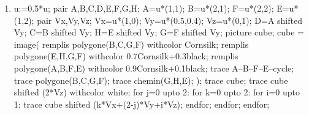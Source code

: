 \begin{exercice*}
\begin{multicols}{2}
\begin{enumerate}
\begin{Geometrie}[CoinHD={(5u,4u)}]
                trace cube shifted (2*Vx+Vy+Vz);
                trace cube shifted (2*Vx);
                trace cube shifted (2*Vx-Vy);
            \end{Geometrie}
            \item
            \begin{Geometrie}[CoinHD={(5u,4u)}]
                u:=0.5*u;
                pair A,B,C,D,E,F,G,H;
                A=u*(1,1);
                B=u*(2,1);
                F=u*(2,2);
                E=u*(1,2);
                pair Vx,Vy,Vz;
                Vx=u*(1,0);
                Vy=u*(0.5,0.4);
                Vz=u*(0,1);
                D=A shifted Vy;
                C=B shifted Vy;
                H=E shifted Vy;
                G=F shifted Vy;
                picture cube;
                cube = image(
                    remplis polygone(B,C,G,F) withcolor Cornsilk;
                    remplis polygone(E,H,G,F) withcolor 0.7Cornsilk+0.3black;
                    remplis polygone(A,B,F,E) withcolor 0.9Cornsilk+0.1black;
                    trace A--B--F--E--cycle;
                    trace polygone(B,C,G,F);
                    trace chemin(G,H,E);
                );        
                trace cube;
                trace cube shifted (2*Vz) withcolor white;
                for j=0 upto 2:
                    for k=0 upto 2:
                        for i=0 upto 1:
                            trace cube shifted (k*Vx+(2-j)*Vy+i*Vz);
                        endfor;
                    endfor;
                endfor;
            \end{Geometrie}
        \end{enumerate}
    \end{multicols}
\end{exercice*}
